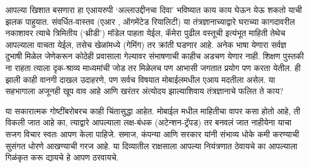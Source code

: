 आपल्या खिशात बसणारा हा एआयरुपी `अल्लाउद्दीनचा दिवा' भविष्यात काय काय घेऊन येऊ शकतो याची झलक पाहुयात. संवर्धित-वास्तव (एआर , ऑगमेंटेड रियालिटी) या तंत्रज्ञानाच्याद्वारे घराच्या कागदावरील नकाशावर त्याचे त्रिमितीय (`थ्रीडी') मॉडेल पाहता येईल, कॅमेरा पुढील वस्तूची इत्यंभूत माहिती तेथेच आपल्याला वाचता येईल, तसेच खेळांमध्ये (गेमिंग) तर क्रांती घडणार आहे. अनेक भाषा येणारा सर्वज्ञ दुभाषी मिळेल जेणेकरून कोठेही प्रवासाला गेल्यावर संभाषणाची काहीच अडचण येणार नाही. शिक्षण पुस्तकी ना राहता त्याला दृक-श्राव्य माध्यमांची जोड तर मिळेलच पण आभासी जगतात प्रयोग पण करता येतील. ही झाली काही वानगी दाखल उदाहरणे, पण सर्वच विषयात मोबाईलमधील एआय मदतीला असेल. या सहभागाला अजूनही खूप वाव आहे आणि खरंतर अंत्योदय झाल्याशिवाय तंत्रज्ञानाचे फलित ते काय?

या सकारात्मक गोष्टींबरोबरच काही चिंतासुद्धा आहेत. मोबाईल मधील माहितीचा वापर कसा होतो आहे, ती विकली जात आहे का, त्याद्वारे आपल्याला लक्ष-बंधक (अटेन्शन-ट्रॅपड) तर बनवलं जात नाहीयेना याचा सजग विचार स्वतः आपण केला पाहिजे. समाज, कंपन्या आणि सरकार यांनी संभाव्य धोके कमी करण्याची सुसंगत धोरणे आखण्याची गरज आहे. या दिव्यातील राक्षसाला आपल्या नियंत्रणात ठेवायचे का आपल्याला गिळंकृत करू द्यायचे हे आपण ठरवायचे.